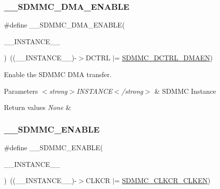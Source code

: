 \subsubsection{\texorpdfstring{\_\_SDMMC\_DMA\_ENABLE}{\_\_SDMMC\_DMA\_ENABLE}}
{\footnotesize\ttfamily \#define \+\_\+\+\_\+\+S\+D\+M\+M\+C\+\_\+\+D\+M\+A\+\_\+\+E\+N\+A\+B\+LE(\begin{DoxyParamCaption}\item[{}]{\+\_\+\+\_\+\+I\+N\+S\+T\+A\+N\+C\+E\+\_\+\+\_\+ }\end{DoxyParamCaption})~((\+\_\+\+\_\+\+I\+N\+S\+T\+A\+N\+C\+E\+\_\+\+\_\+)-\/$>$D\+C\+T\+RL $\vert$= \mbox{\hyperlink{group___peripheral___registers___bits___definition_ga47f4fcb4a5ec9a4e8d077a5edc82ebf8}{S\+D\+M\+M\+C\+\_\+\+D\+C\+T\+R\+L\+\_\+\+D\+M\+A\+EN}})}



Enable the S\+D\+M\+MC D\+MA transfer. 


\begin{DoxyParams}{Parameters}
{\em $<$strong$>$\+I\+N\+S\+T\+A\+N\+C\+E$<$/strong$>$} & S\+D\+M\+MC Instance\\
\hline
\end{DoxyParams}

\begin{DoxyRetVals}{Return values}
{\em None} & \\
\hline
\end{DoxyRetVals}
\mbox{\label{group___s_d_m_m_c___l_l___interrupt___clock_ga20f2287a3097b96bd7e020919a4d0057}} 
\subsubsection{\texorpdfstring{\_\_SDMMC\_ENABLE}{\_\_SDMMC\_ENABLE}}
{\footnotesize\ttfamily \#define \+\_\+\+\_\+\+S\+D\+M\+M\+C\+\_\+\+E\+N\+A\+B\+LE(\begin{DoxyParamCaption}\item[{}]{\+\_\+\+\_\+\+I\+N\+S\+T\+A\+N\+C\+E\+\_\+\+\_\+ }\end{DoxyParamCaption})~((\+\_\+\+\_\+\+I\+N\+S\+T\+A\+N\+C\+E\+\_\+\+\_\+)-\/$>$C\+L\+K\+CR $\vert$= \mbox{\hyperlink{group___peripheral___registers___bits___definition_gac1e13de2f05aca8fb35f2ed47a4e02a6}{S\+D\+M\+M\+C\+\_\+\+C\+L\+K\+C\+R\+\_\+\+C\+L\+K\+EN}})}



